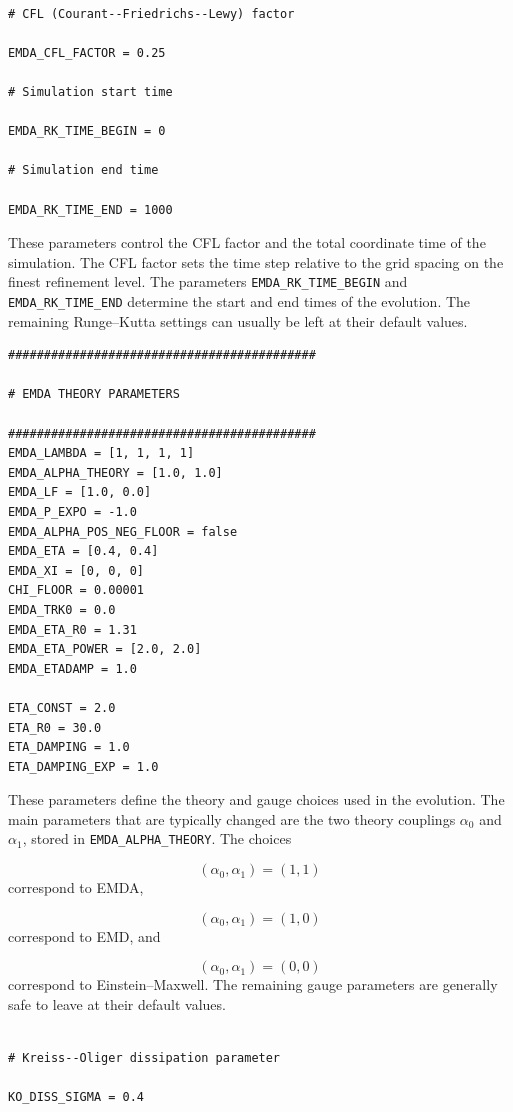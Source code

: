 \begin{verbatim}

# CFL (Courant--Friedrichs--Lewy) factor

EMDA_CFL_FACTOR = 0.25

# Simulation start time

EMDA_RK_TIME_BEGIN = 0

# Simulation end time

EMDA_RK_TIME_END = 1000
\end{verbatim}

These parameters control the CFL factor and the total coordinate time of the
simulation. The CFL factor sets the time step relative to the grid spacing on
the finest refinement level. The parameters \texttt{EMDA\_RK\_TIME\_BEGIN} and
\texttt{EMDA\_RK\_TIME\_END} determine the start and end times of the
evolution. The remaining Runge--Kutta settings can usually be left at their
default values.

\begin{verbatim}
###########################################

# EMDA THEORY PARAMETERS

###########################################
EMDA_LAMBDA = [1, 1, 1, 1]
EMDA_ALPHA_THEORY = [1.0, 1.0]
EMDA_LF = [1.0, 0.0]
EMDA_P_EXPO = -1.0
EMDA_ALPHA_POS_NEG_FLOOR = false
EMDA_ETA = [0.4, 0.4]
EMDA_XI = [0, 0, 0]
CHI_FLOOR = 0.00001
EMDA_TRK0 = 0.0
EMDA_ETA_R0 = 1.31
EMDA_ETA_POWER = [2.0, 2.0]
EMDA_ETADAMP = 1.0

ETA_CONST = 2.0
ETA_R0 = 30.0
ETA_DAMPING = 1.0
ETA_DAMPING_EXP = 1.0
\end{verbatim}

These parameters define the theory and gauge choices used in the evolution. The
main parameters that are typically changed are the two theory couplings
$\alpha_0$ and $\alpha_1$, stored in \texttt{EMDA\_ALPHA\_THEORY}. The choices

\[
(\alpha_0,\alpha_1) = (1,1)
\]
correspond to EMDA,

\[
(\alpha_0,\alpha_1) = (1,0)
\]
correspond to EMD, and

\[
(\alpha_0,\alpha_1) = (0,0)
\]
correspond to Einstein--Maxwell. The remaining gauge parameters are generally
safe to leave at their default values.

\begin{verbatim}

# Kreiss--Oliger dissipation parameter

KO_DISS_SIGMA = 0.4
\end{verbatim}

